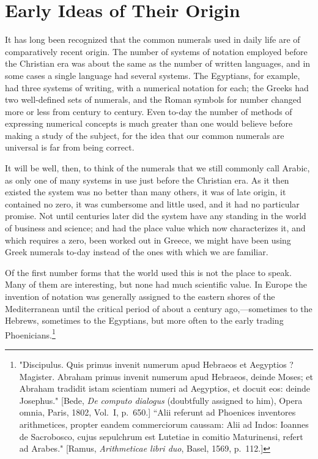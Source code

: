 \documentclass[11pt,a4paper]{article}
\begin{document}
\newpage

\section{Early Ideas of Their Origin}

It has long been recognized that the common numerals used in daily life are of comparatively recent origin. The number of systems of notation employed before the Christian era was about the same as the number of written languages, and in some cases a single language had several systems. The Egyptians, for example, had three systems of writing, with a numerical notation for each; the Greeks had two well-defined sets of numerals, and the Roman symbols for number changed more or less from century to century. Even to-day the number of methods of expressing numerical concepts is much greater than one would believe before making a study of the subject, for the idea that our common numerals are universal is far from being correct.

It will be well, then, to think of the numerals that we still commonly call Arabic, as only one of many systems in use just before the Christian era. As it then existed the system was no better than many others, it was of late origin, it contained no zero, it was cumbersome and little used, and it had no particular promise. Not until centuries later did the system have any standing in the world of business and science; and had the place value which now characterizes it, and which requires a zero, been worked out in Greece, we might have been using Greek numerals to-day instead of the ones with which we are familiar.

Of the first number forms that the world used this is not the place to speak. Many of them are interesting, but none had much scientific value. In Europe the invention of notation was generally assigned to the eastern shores of the Mediterranean until the critical period of about a century ago,---sometimes to the Hebrews, sometimes to the Egyptians, but more often to the early trading Phoenicians.\footnote{"Discipulus. Quis primus invenit numerum apud Hebraeos et Aegyptios ? Magister. Abraham primus invenit numerum apud Hebraeos, deinde Moses; et Abraham tradidit istam scientiam numeri ad Aegyptios, et docuit eos: deinde Josephus." [Bede, \textit{De computo dialogus} (doubtfully assigned to him), Opera omnia, Paris, 1802, Vol.~I, p.~650.] ``Alii referunt ad Phoenices inventores arithmetices, propter eandem commerciorum caussam: Alii ad Indos: Ioannes de Sacrobosco, cujus sepulchrum est Lutetiae in comitio Maturinensi, refert ad Arabes." [Ramus, \textit{Arithmeticae libri duo}, Basel, 1569, p.~112.]}
\end{document}
